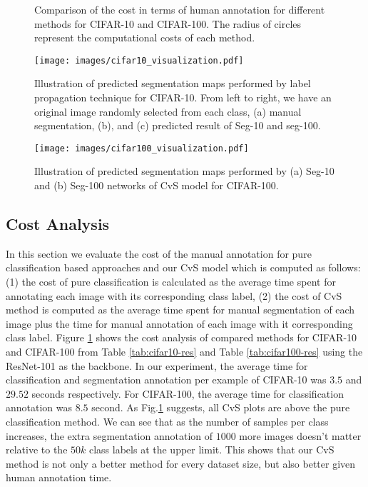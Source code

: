 \documentclass[conference]{IEEEtran}
\begin{document}
%
%
\begin{figure}[ht]
\begin{center}
\end{center}
\begin{center}
\end{center}
\caption{Comparison of the cost in terms of human annotation for different methods for CIFAR-10 and CIFAR-100. The radius of circles represent the computational costs of each method.}
\label{fig:cost_plot}
\end{figure}
%
%
\begin{figure*}[ht]
	\centering
	\texttt{[image: images/cifar10\_visualization.pdf]}
	\caption{Illustration of predicted segmentation maps performed by label propagation technique for CIFAR-10. From left to right, we have an original image randomly selected from each class, (a) manual segmentation, (b), and (c) predicted result of Seg-10 and seg-100.}
	\label{fig:cifar10-images}
\end{figure*}

%
\begin{figure*}[ht]
	\centering
	\texttt{[image: images/cifar100\_visualization.pdf]}
	\caption{Illustration of predicted segmentation maps performed by (a) Seg-10 and (b) Seg-100 networks of CvS model for CIFAR-100.}
	\label{fig:cifar100-images}
\end{figure*}
%
\subsection{Cost Analysis}
In this section we evaluate the cost of the manual annotation for pure classification based approaches and our CvS model which is computed as follows: (1) the cost of pure classification is calculated as the average time spent for annotating each image with its corresponding class label, (2) the cost of CvS method is computed as the average time spent for manual segmentation of each image plus the time for manual annotation of each image with it corresponding class label. Figure \ref{fig:cost_plot} shows the cost analysis of compared methods for CIFAR-10 and CIFAR-100 from Table \ref{tab:cifar10-res} and Table \ref{tab:cifar100-res} using the ResNet-101 as the backbone. In our experiment, the average time for classification and segmentation annotation per example of CIFAR-10 was $3.5$ and $29.52$ seconds respectively. For CIFAR-100, the average time for classification annotation was $8.5$ second. As Fig.\ref{fig:cost_plot} suggests, all CvS plots are above the pure classification method. We can see that as the number of samples per class increases, the extra segmentation annotation of $1000$ more images doesn't matter relative to the $50k$ class labels at the upper limit. This shows that our CvS method is not only a better method for every dataset size, but also better given human annotation time.
\end{document}
